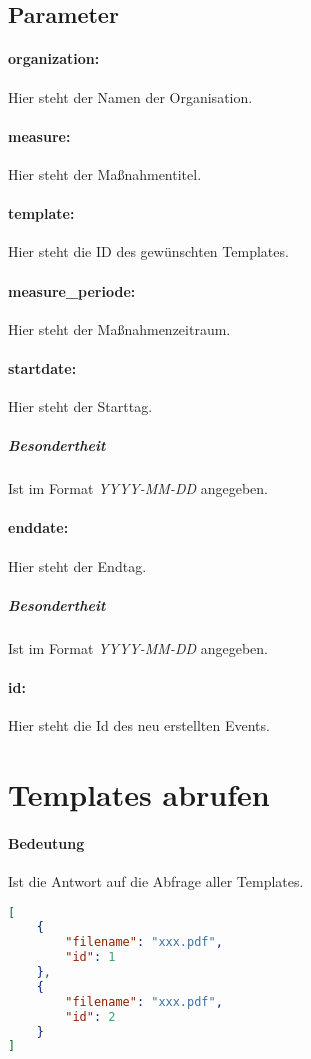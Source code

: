 \documentclass[12pt,parskip=full, pagea4]{scrreprt}
\begin{document}
			\subsection{Parameter}
			\paragraph{organization:}Hier steht der Namen der Organisation.
			\paragraph{measure:}Hier steht der Maßnahmentitel.
			\paragraph{template:}Hier steht die ID des gew\"unschten Templates.
			\paragraph{measure\_periode:}Hier steht der Maßnahmenzeitraum.
			\paragraph{startdate:}Hier steht der Starttag.
			\subparagraph{Besondertheit} \leftskip=1.5cm Ist im Format \textit{YYYY-MM-DD} angegeben.
			\paragraph{enddate:} \leftskip=0cm Hier steht der Endtag.
			\subparagraph{Besondertheit} \leftskip=1.5cm Ist im Format \textit{YYYY-MM-DD} angegeben.
			\paragraph{id:} \leftskip=0cm Hier steht die Id des neu erstellten Events.
			
			\leftskip=0cm
			
			\section{Templates abrufen}
			\paragraph{Bedeutung} Ist die Antwort auf die Abfrage aller Templates.
			\begin{lstlisting}[language=JSON]
[
	{
		"filename": "xxx.pdf",
		"id": 1
	},
	{
		"filename": "xxx.pdf",
		"id": 2
	}
]
			\end{lstlisting}
\end{document}
